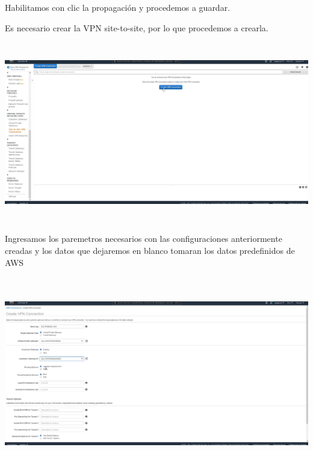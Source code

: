 \documentclass{article} %
\begin{document}
\noindent 

\noindent 

\noindent Habilitamos con clic la propagaci\'{o}n y procedemos a guardar. 

\noindent 

\noindent 

\noindent 

\noindent 

\noindent 

\noindent 

\noindent 

\noindent 

\noindent 

\noindent Es necesario crear la VPN site-to-site, por lo que procedemos a crearla.  

\noindent 

\noindent \includegraphics*[width=5.60in, height=3.11in, trim=0.00in 0.00in 0.97in 0.00in]{image16}

\noindent 

\noindent Ingresamos los paremetros necesarios con las configuraciones anteriormente creadas y los datos que dejaremos en blanco tomaran los datos predefinidos de AWS

\noindent 

\noindent 

\noindent \includegraphics*[width=5.80in, height=3.34in, trim=0.00in 0.11in 1.47in 0.00in]{image17}
\end{document}
